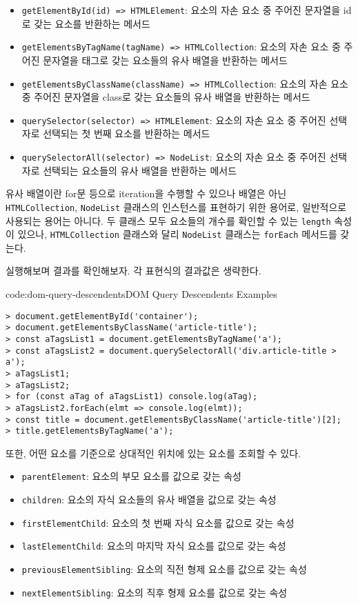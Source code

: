 \begin{itemize}
    \item \texttt{getElementById(id) => HTMLElement}: 요소의 자손 요소 중 주어진 문자열을 id로 갖는 요소를 반환하는 메서드
    \item \texttt{getElementsByTagName(tagName) => HTMLCollection}: 요소의 자손 요소 중 주어진 문자열을 태그로 갖는 요소들의 유사 배열을 반환하는 메서드
    \item \texttt{getElementsByClassName(className) => HTMLCollection}: 요소의 자손 요소 중 주어진 문자열을 class로 갖는 요소들의 유사 배열을 반환하는 메서드
    \item \texttt{querySelector(selector) => HTMLElement}: 요소의 자손 요소 중 주어진 선택자로 선택되는 첫 번째 요소를 반환하는 메서드
    \item \texttt{querySelectorAll(selector) => NodeList}: 요소의 자손 요소 중 주어진 선택자로 선택되는 요소들의 유사 배열을 반환하는 메서드
\end{itemize}

유사 배열이란 for문 등으로 iteration을 수행할 수 있으나 배열은 아닌 \texttt{HTMLCollection}, \texttt{NodeList} 클래스의 인스턴스를 표현하기 위한 용어로, 일반적으로 사용되는 용어는 아니다. 두 클래스 모두 요소들의 개수를 확인할 수 있는 \texttt{length} 속성이 있으나, \texttt{HTMLCollection} 클래스와 달리 \texttt{NodeList} 클래스는 \texttt{forEach} 메서드를 갖는다.

\를 실행해보며 결과를 확인해보자. 각 표현식의 결과값은 생략한다.
\newpage

\begin{codeenv}{code:dom-query-descendents}{DOM Query Descendents Examples}\begin{verbatim}
> document.getElementById('container');
> document.getElementsByClassName('article-title');
> const aTagsList1 = document.getElementsByTagName('a');
> const aTagsList2 = document.querySelectorAll('div.article-title > a');
> aTagsList1;
> aTagsList2;
> for (const aTag of aTagsList1) console.log(aTag);
> aTagsList2.forEach(elmt => console.log(elmt));
> const title = document.getElementsByClassName('article-title')[2];
> title.getElementsByTagName('a');
\end{verbatim}
\end{codeenv}

또한, 어떤 요소를 기준으로 상대적인 위치에 있는 요소를 조회할 수 있다.

\begin{itemize}
    \item \texttt{parentElement}: 요소의 부모 요소를 값으로 갖는 속성
    \item \texttt{children}: 요소의 자식 요소들의 유사 배열을 값으로 갖는 속성
    \item \texttt{firstElementChild}: 요소의 첫 번째 자식 요소를 값으로 갖는 속성
    \item \texttt{lastElementChild}: 요소의 마지막 자식 요소를 값으로 갖는 속성
    \item \texttt{previousElementSibling}: 요소의 직전 형제 요소를 값으로 갖는 속성
    \item \texttt{nextElementSibling}: 요소의 직후 형제 요소를 값으로 갖는 속성
\end{itemize}

